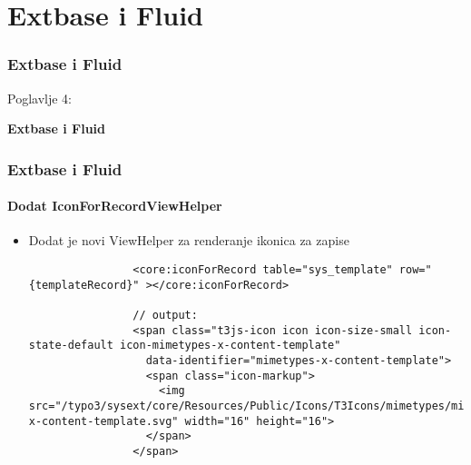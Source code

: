 %

\section{Extbase i Fluid}
\begin{frame}[fragile]
	\frametitle{Extbase i Fluid}

	\begin{center}\huge{Poglavlje 4:}\end{center}
	\begin{center}\huge{\color{typo3darkgrey}\textbf{Extbase i Fluid}}\end{center}

\end{frame}

\begin{frame}[fragile]
	\frametitle{Extbase i Fluid}
	\framesubtitle{Dodat IconForRecordViewHelper}

	\lstset{basicstyle=\tiny\ttfamily}

	\begin{itemize}

		\item Dodat je novi ViewHelper za renderanje ikonica za zapise

			\begin{lstlisting}
				<core:iconForRecord table="sys_template" row="{templateRecord}" ></core:iconForRecord>

				// output:
				<span class="t3js-icon icon icon-size-small icon-state-default icon-mimetypes-x-content-template"
				  data-identifier="mimetypes-x-content-template">
				  <span class="icon-markup">
				    <img src="/typo3/sysext/core/Resources/Public/Icons/T3Icons/mimetypes/mimetypes-x-content-template.svg" width="16" height="16">
				  </span>
				</span>
			\end{lstlisting}

	\end{itemize}

\end{frame}

